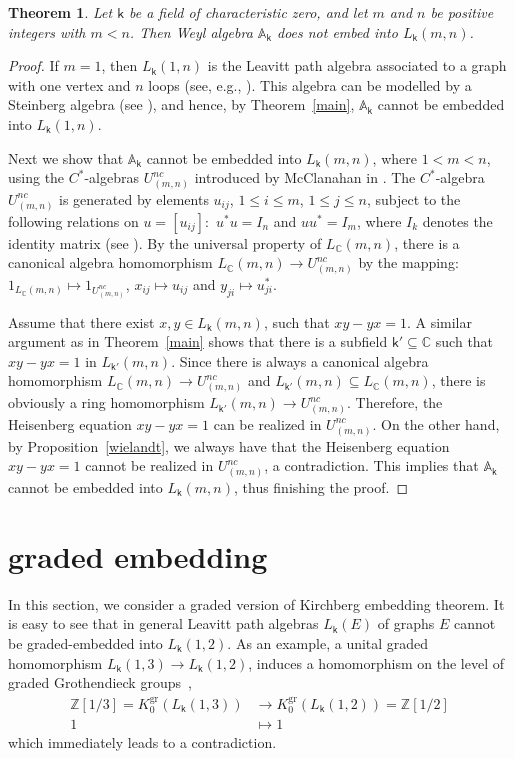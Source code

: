 \documentclass[a4paper, 11pt, reqno]{amsart}
\newtheorem{thm}{Theorem}[section]
\theoremstyle{definition}
\newcommand{\K}{\mathsf{k}}
\newcommand{\gr}{\operatorname{gr}}
\begin{document}
\begin{thm}\label{globalmain}
Let $\K$ be a field of characteristic zero, and  let $m$ and $n$ be positive integers with $m < n$.
Then  Weyl algebra $\mathbb A_\K$ does not embed into $L_\K(m,n)$.
\end{thm}
\begin{proof}
If $m=1$, then  $L_\K(1,n)$ is the Leavitt path algebra associated to a graph with one vertex and $n$ loops (see, e.g., \cite[Proposition 1.3.2]{lpabook}). This algebra can be modelled by a Steinberg algebra (see \cite[Example 3.2]{clarksims}), and hence, by Theorem~\ref{main}, $\mathbb A_\K$ cannot be embedded into $L_\K(1,n)$. 

Next we show that $\mathbb A_\K$ cannot be embedded into $L_\K(m,n)$, where $1 < m < n$, using the $C^*$-algebras $U^{nc}_{(m, n)}$ introduced by McClanahan in \cite{mccal2}. The  $C^*$-algebra $U^{nc}_{(m, n)}$ is generated by elements $u_{ij}$, $1\le i\le m$, $1\le j\le n$, subject to the following relations on $u = [u_{ij}]:$ $u^*u = I_n$ and $uu^* = I_m$, where $I_k$ denotes the identity matrix (see \cite{mccal2}). By the universal property of $L_{\mathbb{C}}(m, n)$, there is a canonical algebra homomorphism $L_{\mathbb{C}}(m, n)\longrightarrow U^{nc}_{(m, n)}$ by the mapping: $1_{L_{\mathbb{C}}(m, n)}\longmapsto 1_{U^{nc}_{(m, n)}}$, $x_{ij}\longmapsto u_{ij}$ and $y_{ji}\longmapsto u^*_{ji}$.

Assume that there exist $x,y\in L_\K(m,n)$, such that $xy-yx=1$. A similar argument as in Theorem~\ref{main} shows that there is a subfield $\K' \subseteq \mathbb C$ such that $xy-yx=1$ in $L_{\K'}(m,n)$.  Since there is always a canonical algebra homomorphism $L_{\mathbb{C}}(m, n)\longrightarrow U^{nc}_{(m, n)}$ and $L_{\K'}(m,n) \subseteq L_{\mathbb{C}}(m,n)$, there is obviously a ring homomorphism  $L_{\K'}(m,n)\rightarrow U^{nc}_{(m, n)}$. Therefore, the Heisenberg equation $xy-yx=1$ can be realized in $U^{nc}_{(m, n)}$. On the other hand, by Proposition~\ref{wielandt}, we always have that  the Heisenberg equation $xy-yx=1$ cannot be realized in $U^{nc}_{(m, n)}$, a contradiction. This implies that $\mathbb A_\K$ cannot be embedded into $L_\K(m,n)$, thus finishing the proof.
\end{proof}
\medskip

\section{graded embedding}
In this section, we consider a graded version of Kirchberg embedding theorem. It is easy to see that in general Leavitt path algebras $L_\K(E)$ of graphs $E$ cannot be graded-embedded into $L_\K(1, 2)$. As an example,  a unital graded homomorphism $L_\K(1,3)\rightarrow L_\K(1,2)$, induces a homomorphism on the level of graded Grothendieck groups~\cite[\S3]{hazi}, 
\begin{align*}
\mathbb Z[1/3] = K_0^{\gr}(L_\K(1,3)) &\longrightarrow K_0^{\gr}(L_\K(1,2)) = \mathbb Z[1/2]\\
1 &\longmapsto 1
\end{align*}
which immediately leads to a contradiction. 
\end{document}
